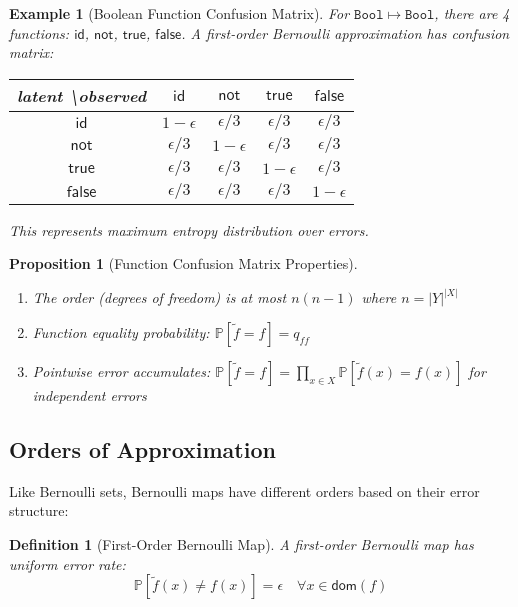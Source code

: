 \documentclass[11pt,final,hidelinks]{article}
\newtheorem{proposition}[theorem]{Proposition}
\newtheorem{definition}[theorem]{Definition}
\newtheorem{example}[theorem]{Example}
\newcommand{\obs}[1]{\widetilde{#1}}  %
\newcommand{\Type}[1]{\mathtt{#1}}
\newcommand{\Prob}[1]{\mathbb{P}\left[#1\right]}
\newcommand{\error}{\epsilon}
\newcommand{\Bool}{\Type{Bool}}
\newcommand{\Dom}{\mathsf{dom}}
\begin{document}
\begin{example}[Boolean Function Confusion Matrix]
For $\Bool \mapsto \Bool$, there are 4 functions: $\mathsf{id}$, $\mathsf{not}$, $\mathsf{true}$, $\mathsf{false}$. A first-order Bernoulli approximation has confusion matrix:

\begin{center}
\begin{tabular}{c|cccc}
latent \textbackslash observed & $\mathsf{id}$ & $\mathsf{not}$ & $\mathsf{true}$ & $\mathsf{false}$ \\
\hline
$\mathsf{id}$ & $1-\epsilon$ & $\epsilon/3$ & $\epsilon/3$ & $\epsilon/3$ \\
$\mathsf{not}$ & $\epsilon/3$ & $1-\epsilon$ & $\epsilon/3$ & $\epsilon/3$ \\
$\mathsf{true}$ & $\epsilon/3$ & $\epsilon/3$ & $1-\epsilon$ & $\epsilon/3$ \\
$\mathsf{false}$ & $\epsilon/3$ & $\epsilon/3$ & $\epsilon/3$ & $1-\epsilon$
\end{tabular}
\end{center}

This represents maximum entropy distribution over errors.
\end{example}

\begin{proposition}[Function Confusion Matrix Properties]
\begin{enumerate}
    \item The order (degrees of freedom) is at most $n(n-1)$ where $n = |Y|^{|X|}$
    \item Function equality probability: $\Prob{\obs{f} = f} = q_{ff}$
    \item Pointwise error accumulates: $\Prob{\obs{f} = f} = \prod_{x \in X} \Prob{\obs{f}(x) = f(x)}$ for independent errors
\end{enumerate}
\end{proposition}

\subsection{Orders of Approximation}

Like Bernoulli sets, Bernoulli maps have different orders based on their error structure:

\begin{definition}[First-Order Bernoulli Map]
A first-order Bernoulli map has uniform error rate:
\begin{equation}
\Prob{\obs{f}(x) \neq f(x)} = \error \quad \forall x \in \Dom(f)
\end{equation}
\end{definition}
\end{document}
